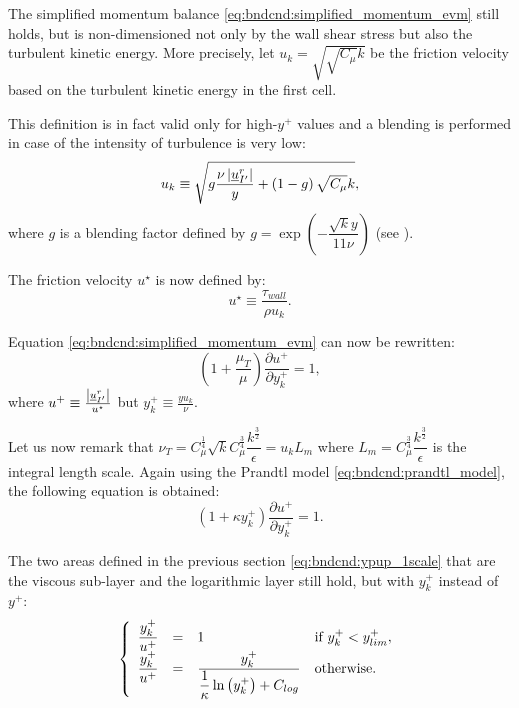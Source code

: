 The simplified momentum balance \eqref{eq:bndcnd:simplified_momentum_evm} still holds, but is non-dimensioned not only
by the wall shear stress but also the turbulent kinetic energy. More precisely, let $u_k = \sqrt{\sqrt{C_\mu} k }$ be the friction velocity based on
the turbulent kinetic energy in the first cell.

This definition is in fact valid only for high-$y^+$ values and a blending is performed in case of the intensity of turbulence is very low:
\begin{equation}\label{eq:def_uk}
u_k \equiv \sqrt{ g  \dfrac{\nu \left|  \underline{u}^r_{{I^\prime}} \right|}{y} + \left(1-g\right)\sqrt{C_\mu}k },
\end{equation}
where $g$ is a blending factor defined by $g = \exp \left(- \dfrac{\sqrt{k} y}{11 \nu} \right)$ (see \cite{}).

The friction velocity $u^\star $ is now defined by:
\begin{equation}\label{eq:bndcnd:ustar_2scale2_def}
u^\star \equiv  \dfrac{\tau_{wall}}{\rho u_k}.
\end{equation}

Equation \eqref{eq:bndcnd:simplified_momentum_evm} can now be rewritten:
%
\begin{equation}\label{eq:bndcnd:simplified_momentum_evm_2scales}
\left( 1 + \dfrac{\mu_T}{ \mu} \right) \dfrac{\partial u^+}{\partial y^+_k} = 1,
\end{equation}
where $u^+ \equiv \frac{\left|  \underline{u}^r_{{I^\prime}}  \right|}{u^\star}$ but $ y^+_k \equiv \frac{y u_k}{ \nu}$.

Let us now remark that $\nu_T = C_\mu^{\frac{1}{4}}\sqrt{k}  C_\mu^{\frac{3}{4}} \dfrac{k^{\frac{3}{2}}}{\epsilon} = u_k L_m $ where
$L_m = C_\mu^{\frac{3}{4}} \dfrac{k^{\frac{3}{2}}}{\epsilon}$ is the integral length scale. Again using the Prandtl model \eqref{eq:bndcnd:prandtl_model},
the following equation is obtained:
%
\begin{equation}\label{eq:bndcnd:simplified_momentum_evm_adim_2scales}
\left( 1 + \kappa y_k^+ \right) \dfrac{\partial u^+}{\partial y^+_k} = 1.
\end{equation}

The two areas defined in the previous section \eqref{eq:bndcnd:ypup_1scale} that are the viscous sub-layer and the logarithmic layer still hold, but with $y^+_k$ instead of $y^+$:
%
\begin{equation}\label{eq:bndcnd:ypup_2scale}
\left\lbrace
\begin{array}{r c l l}
\dfrac{y^+_k}{u^+} &=& 1 & \textrm{if } y^+_k < y^+_{lim}, \\
\dfrac{y^+_k}{u^+} &=& \dfrac{y^+_k}{ \dfrac{1}{\kappa} \ln \left( y^+_k\right) + C_{log}} & \textrm{otherwise}.
\end{array}
\right.
\end{equation}

